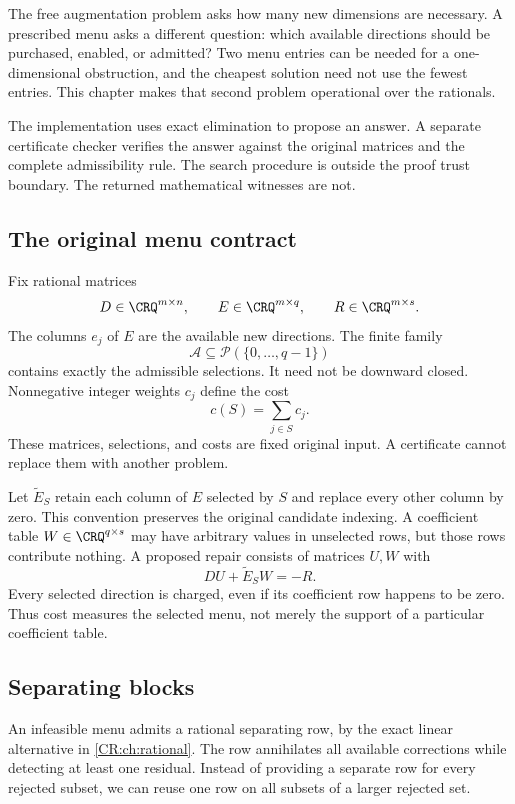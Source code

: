 The free augmentation problem asks how many new dimensions are necessary. A prescribed menu asks a different question: which available directions should be purchased, enabled, or admitted? Two menu entries can be needed for a one-dimensional obstruction, and the cheapest solution need not use the fewest entries. This chapter makes that second problem operational over the rationals.

The implementation uses exact elimination to propose an answer. A separate certificate checker verifies the answer against the original matrices and the complete admissibility rule. The search procedure is outside the proof trust boundary. The returned mathematical witnesses are not.

\subsection{The original menu contract}

Fix rational matrices
\[
 D\in\CRQ^{m\times n},\qquad E\in\CRQ^{m\times q},\qquad R\in\CRQ^{m\times s}.
\]
The columns $e_j$ of $E$ are the available new directions. The finite family
\[
 \mathcal A\subseteq\mathcal P(\{0,\ldots,q-1\})
\]
contains exactly the admissible selections. It need not be downward closed. Nonnegative integer weights $c_j$ define the cost
\[
 c(S)=\sum_{j\in S}c_j.
\]
These matrices, selections, and costs are fixed original input. A certificate cannot replace them with another problem.

Let $\widetilde E_S$ retain each column of $E$ selected by $S$ and replace every other column by zero. This convention preserves the original candidate indexing. A coefficient table $W\in\CRQ^{q\times s}$ may have arbitrary values in unselected rows, but those rows contribute nothing. A proposed repair consists of matrices $U,W$ with
\begin{equation}
 DU+\widetilde E_SW=-R.
 \label{CR:eq:menu-cover-primal}
\end{equation}
Every selected direction is charged, even if its coefficient row happens to be zero. Thus cost measures the selected menu, not merely the support of a particular coefficient table.

\subsection{Separating blocks}

An infeasible menu admits a rational separating row, by the exact linear alternative in \cref{CR:ch:rational}. The row annihilates all available corrections while detecting at least one residual. Instead of providing a separate row for every rejected subset, we can reuse one row on all subsets of a larger rejected set.

